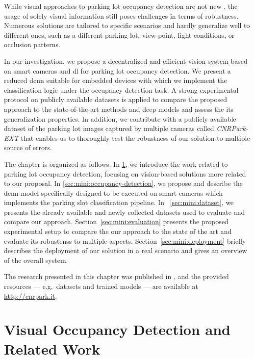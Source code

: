 While visual approaches to parking lot occupancy detection are not new \cite{dan2002parking,wu2007robust,del2015vacant,de2015pklot}, the usage of solely visual information still poses challenges in terms of robustness.
Numerous solutions are tailored to specific scenarios and hardly generalize well to different ones, such as a different parking lot, view-point, light conditions, or occlusion patterns.

In our investigation, we propose a decentralized and efficient vision system based on smart cameras and \gls{dl} for parking lot occupancy detection.
We present a reduced \gls{dcnn} suitable for embedded devices with which we implement the classification logic under the occupancy detection task.
A strong experimental protocol on publicly available datasets is applied to compare the proposed approach to the state-of-the-art methods and deep models and assess the its generalization properties.
In addition, we contribute with a publicly available dataset of the parking lot images captured by multiple cameras called \emph{CNRPark-EXT} that enables us to thoroughly test the robustness of our solution to multiple source of errors.

The chapter is organized as follows.
In \ref{sec:mini:related-work}, we introduce the work related to parking lot occupancy detection, focusing on vision-based solutions more related to our proposal.
In \ref{sec:mini:occupancy-detection}, we propose and describe the \gls{dcnn} model specifically designed to be executed on smart cameras which implements the parking slot classification pipeline.
In ~\ref{sec:mini:dataset}, we presents the already available and newly collected datasets used to evaluate and compare our approach.
Section~\ref{sec:mini:evaluation} presents the proposed experimental setup to compare the our approach to the state of the art and evaluate its robustenss to multiple aspects.
Section~\ref{sec:mini:deployment} briefly describes the deployment of our solution in a real scenario and gives an overview of the overall system.

The research presented in this chapter was published in \cite{amato2016car,amato2017deep}, and the provided resources --- e.g.\ datasets and trained models --- are available at \url{http://cnrpark.it}.

\section{Visual Occupancy Detection and Related Work}
\label{sec:mini:related-work}

